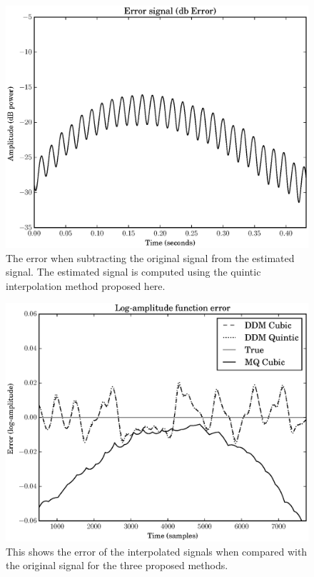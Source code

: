 \documentclass[letterpaper,12pt]{report}
\begin{document}
\begin{figure}
    \includegraphics[width=\textwidth]{plots/mq_mod_quintic_error.eps}
    \caption{The error when subtracting the original signal from the estimated
        signal. The estimated signal is computed using the quintic interpolation
        method proposed here.
    \label{plot:mqmodcubicerror}}
\end{figure}

\begin{figure}
    \includegraphics[width=\textwidth]{plots/mq_mod_err_comp_logamp_err.eps}
    \caption{This shows the error of the interpolated signals when compared
    with the original signal for the three proposed methods.
    \label{plot:mqmoderrcomplogamperr}}
\end{figure}
\end{document}
